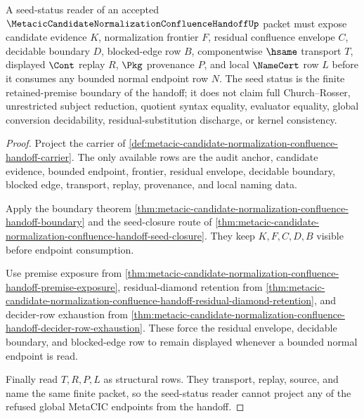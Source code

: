 \begin{theorem}
\label{thm:metacic-candidate-normalization-confluence-handoff-seed-status}
A seed-status reader of an accepted $\MetacicCandidateNormalizationConfluenceHandoffUp$ packet must expose candidate evidence $K$, normalization frontier $F$, residual confluence envelope $C$, decidable boundary $D$, blocked-edge row $B$, componentwise $\hsame$ transport $T$, displayed $\Cont$ replay $R$, $\Pkg$ provenance $P$, and local $\NameCert$ row $L$ before it consumes any bounded normal endpoint row $N$. The seed status is the finite retained-premise boundary of the handoff; it does not claim full Church--Rosser, unrestricted subject reduction, quotient syntax equality, evaluator equality, global conversion decidability, residual-substitution discharge, or kernel consistency.
\end{theorem}
\begin{proof}
Project the carrier of \autoref{def:metacic-candidate-normalization-confluence-handoff-carrier}. The only available rows are the audit anchor, candidate evidence, bounded endpoint, frontier, residual envelope, decidable boundary, blocked edge, transport, replay, provenance, and local naming data.

Apply the boundary theorem \autoref{thm:metacic-candidate-normalization-confluence-handoff-boundary} and the seed-closure route of \autoref{thm:metacic-candidate-normalization-confluence-handoff-seed-closure}. They keep $K,F,C,D,B$ visible before endpoint consumption.

Use premise exposure from \autoref{thm:metacic-candidate-normalization-confluence-handoff-premise-exposure}, residual-diamond retention from \autoref{thm:metacic-candidate-normalization-confluence-handoff-residual-diamond-retention}, and decider-row exhaustion from \autoref{thm:metacic-candidate-normalization-confluence-handoff-decider-row-exhaustion}. These force the residual envelope, decidable boundary, and blocked-edge row to remain displayed whenever a bounded normal endpoint is read.

Finally read $T,R,P,L$ as structural rows. They transport, replay, source, and name the same finite packet, so the seed-status reader cannot project any of the refused global MetaCIC endpoints from the handoff.
\end{proof}

